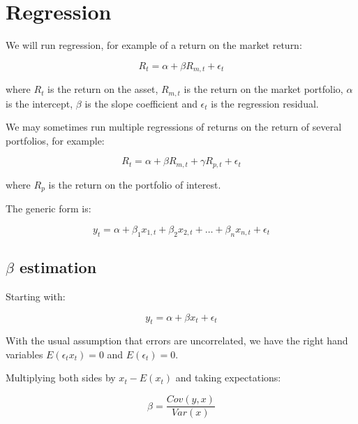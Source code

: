 \chapter{Regression}


We will run regression, for example of a return 
on the market return:

\begin{equation}
    \label{eq:regression}
    R_t = \alpha + \beta R_{m,t} + \epsilon_t
\end{equation}

where $R_t$ is the return on the asset, $R_{m,t}$ is the return on the market
portfolio, $\alpha$ is the intercept, $\beta$ is the slope coefficient and
$\epsilon_t$ is the regression residual.

We may sometimes run multiple regressions of returns on the return
of several portfolios, for example:

\begin{equation}
    \label{eq:multiregression}
    R_t = \alpha + \beta R_{m,t} + \gamma R_{p,t} + \epsilon_t
\end{equation}

where $R_p$ is the return on the portfolio of interest.

The generic form is:

\begin{equation}
    \label{eq:genericregression}
    y_t = \alpha + \beta_1 x_{1,t} + \beta_2 x_{2,t} + \ldots + \beta_n x_{n,t} + \epsilon_t
\end{equation}

\section{$\beta$ estimation}

Starting with:

\begin{equation}
y_t = \alpha + \beta x_t + \epsilon_t
\end{equation}

With the usual assumption that errors are uncorrelated, we have 
the right hand variables $E(\epsilon_t x_t) = 0$ and $E(\epsilon_t) = 0$.

Multiplying both sides by $x_t - E(x_t)$ and taking expectations:


\begin{equation}
    \label{eq:population}
    \beta = \frac{Cov(y,x)}{Var(x)}
\end{equation}
